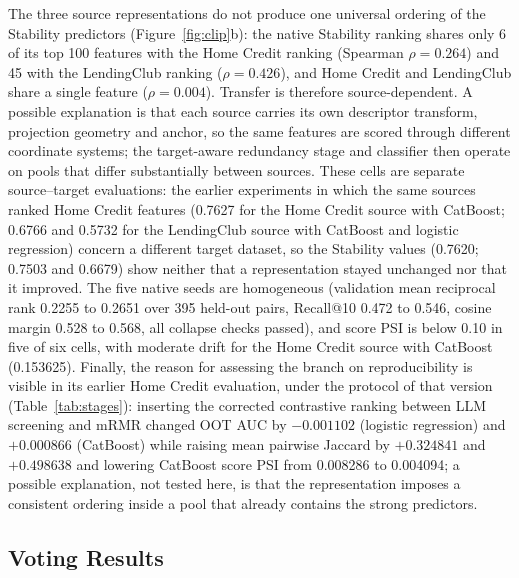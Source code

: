 \documentclass[final,5p,twocolumn]{elsarticle}
\begin{document}
The three source representations do not produce one universal ordering of the Stability predictors (Figure~\ref{fig:clip}b): the native Stability ranking shares only 6 of its top 100 features with the Home Credit ranking (Spearman $\rho=0.264$) and 45 with the LendingClub ranking ($\rho=0.426$), and Home Credit and LendingClub share a single feature ($\rho=0.004$). Transfer is therefore source-dependent. A possible explanation is that each source carries its own descriptor transform, projection geometry and anchor, so the same features are scored through different coordinate systems; the target-aware redundancy stage and classifier then operate on pools that differ substantially between sources. These cells are separate source--target evaluations: the earlier experiments in which the same sources ranked Home Credit features (0.7627 for the Home Credit source with CatBoost; 0.6766 and 0.5732 for the LendingClub source with CatBoost and logistic regression) concern a different target dataset, so the Stability values (0.7620; 0.7503 and 0.6679) show neither that a representation stayed unchanged nor that it improved. The five native seeds are homogeneous (validation mean reciprocal rank 0.2255 to 0.2651 over 395 held-out pairs, Recall@10 0.472 to 0.546, cosine margin 0.528 to 0.568, all collapse checks passed), and score PSI is below 0.10 in five of six cells, with moderate drift for the Home Credit source with CatBoost (0.153625). Finally, the reason for assessing the branch on reproducibility is visible in its earlier Home Credit evaluation, under the protocol of that version (Table~\ref{tab:stages}): inserting the corrected contrastive ranking between LLM screening and mRMR changed OOT AUC by $-0.001102$ (logistic regression) and $+0.000866$ (CatBoost) while raising mean pairwise Jaccard by $+0.324841$ and $+0.498638$ and lowering CatBoost score PSI from 0.008286 to 0.004094; a possible explanation, not tested here, is that the representation imposes a consistent ordering inside a pool that already contains the strong predictors.

\subsection{Voting Results}
\label{subsec:voting_results}
\end{document}
